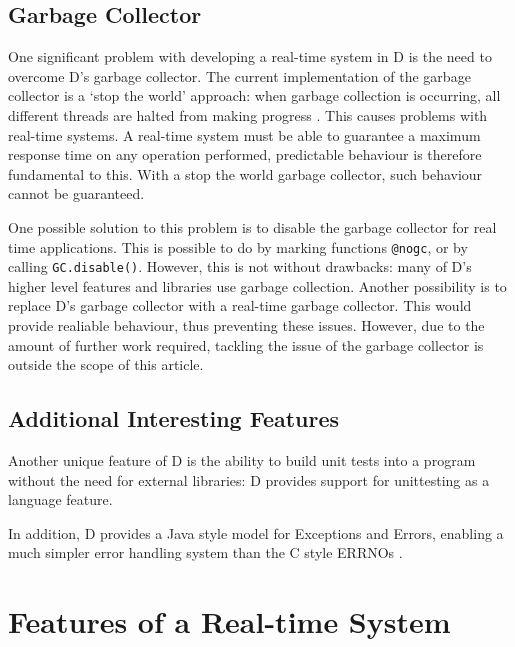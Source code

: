 \subsection{Garbage Collector}
One significant problem with developing a real-time system in D is the need to 
overcome D's garbage collector. The current implementation of the garbage 
collector is a `stop the world' approach: when garbage collection is occurring, 
all different threads are halted from making progress 
\cite{dlang-garbage}. This causes problems with 
real-time systems. A real-time system must be able to guarantee a maximum response 
time on any operation performed, predictable behaviour is therefore fundamental to this. 
With a stop the world garbage collector, such behaviour cannot be guaranteed. 
\par\bigskip\noindent
One possible solution to this problem is to disable the garbage collector for 
real time applications. This is possible to do by marking functions \texttt{@nogc}, 
or by calling \texttt{GC.disable()}. However, this is not without drawbacks: 
many of D's higher level features and libraries use garbage collection. 
Another possibility is to replace D's garbage collector with a real-time 
garbage collector. This would provide realiable behaviour, thus preventing these 
issues. However, 
due to the amount of further work required, tackling the issue of the garbage 
collector is outside the scope of this article.

\subsection{Additional Interesting Features}
Another unique feature of D is the ability to build unit tests into a 
program without the need for external libraries: D provides support for 
unittesting as a language feature. 
\par\bigskip\noindent
In addition, D provides a Java style model for Exceptions and Errors, enabling 
a much simpler error handling system than the C style ERRNOs 
\cite{ddili-book}. 






\section{Features of a Real-time System}


